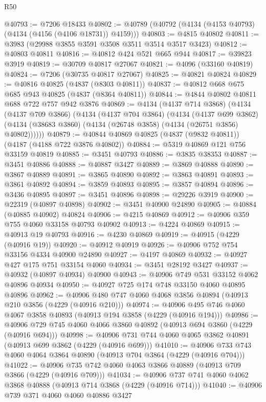 \begin{lexlean}{R50}
\begin{coremodule}
@40793 := @7206 @18433
@40802 := @40789 (@40792 (@4134 (@4153 @40793) (@4134 (@4156 (@4106 @18731)) @4159)))
@40803 := @4815 @40802
@40811 := @3983 (@29988 @3855 @3591 @3508 @3511 @3514 @3517 @3423)
@40812 := @40803 @40811
@40816 := @40812 @424 @521 @665 @944
@40817 := @39823 @3919
@40819 := @30709 @40817 @27067
@40821 := @4096 (@33160 @40819)
@40824 := @7206 (@30735 @40817 @27067)
@40825 := @40821 @40824
@40829 := @40816 @40825 (@4837 (@8303 @40811))
@40837 := @40812 @668 @675 @685 @943 @40825 (@4837 (@8364 @40811))
@40844 := @4844 @40802 @40811 @688 @722 @757 @942 @3876
@40869 := @4134
    (@4137 @714 @3868)
    (@4134
      (@4137 @709 @3866)
      (@4134
        (@4137 @704 @3864)
        (@4134
          (@4137 @699 @3862)
          (@4134 (@38683 @3860) (@4134 (@26748 @3858) (@4134 (@26751 @3856) @40802))))))
@40879 := @40844 @40869 @40825 (@4837 (@9832 @40811)) (@4187 (@4188 @722 @3876 @40802))
@40884 := @5319 @40869 @121 @756 @33159 @40819
@40885 := @3451 @40793
@40886 := @3835 @38353
@40887 := @3451 @40886
@40888 := @40887 @3427
@40889 := @3869 @40888
@40890 := @3867 @40889
@40891 := @3865 @40890
@40892 := @3863 @40891
@40893 := @3861 @40892
@40894 := @3859 @40893
@40895 := @3857 @40894
@40896 := @3436 @40895
@40897 := @3451 @40896
@40898 := @29226 @3919
@40900 := @22319 (@40897 @40898)
@40902 := @3451 @40900 @24890
@40905 := @40884 (@40885 @40902) @40824
@40906 := @4215 @40869
@40912 := @40906 @359 @755 @4060 @33158 @40793 @40902
@40913 := @4224 @40869
@40915 := @40913 @19 @40793
@40916 := @4230 @40869
@40919 := @40915 (@4229 (@40916 @19))
@40920 := @40912 @40919
@40926 := @40906 @752 @754 @33156 @4334 @40900 @24890
@40927 := @4197 @40869
@40932 := @40927 @427 @175 @751 @33154 @4060
@40934 := @3451 @28192 @3427
@40937 := @40932 (@40897 @40934) @40900
@40943 := @40906 @749 @531 @33152 @4062 @40896 @40934
@40950 := @40927 @725 @174 @748 @33150 @4060 @40895 @40896
@40962 := @40906 @480 @747 @4060 @4068 @3856 @40894 (@40913 @210 @3856 (@4229 (@40916 @210)))
@40974 := @40906 @495 @746 @4060 @4067 @3858 @40893 (@40913 @194 @3858 (@4229 (@40916 @194)))
@40986 := @40906 @729 @745 @4060 @4066 @3860 @40892 (@40913 @694 @3860 (@4229 (@40916 @694)))
@40998 := @40906 @731 @744 @4060 @4065 @3862 @40891 (@40913 @699 @3862 (@4229 (@40916 @699)))
@41010 := @40906 @733 @743 @4060 @4064 @3864 @40890 (@40913 @704 @3864 (@4229 (@40916 @704)))
@41022 := @40906 @735 @742 @4060 @4063 @3866 @40889 (@40913 @709 @3866 (@4229 (@40916 @709)))
@41034 := @40906 @737 @741 @4060 @4062 @3868 @40888 (@40913 @714 @3868 (@4229 (@40916 @714)))
@41040 := @40906 @739 @371 @4060 @4060 @40886 @3427

\end{coremodule}
\end{lexlean}
